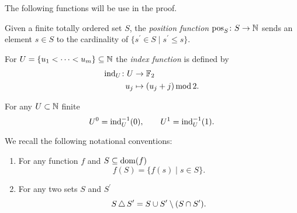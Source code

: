 The following functions will be use in the proof.

\begin{definition} \label{d:position function}
	Given a finite totally ordered set $S$, the \textit{position function} $\operatorname{pos}_S \colon S \to \mathbb{N}$ sends an element $s \in S$ to the cardinality of $\{s^\prime \in S \mid s^\prime \leq s\}$.
\end{definition}

\begin{definition} \label{d:index function}
	For $U = \{u_1 < \cdots < u_m\} \subseteq \mathbb{N}$ the \textit{index function} is defined by
	\[
	\begin{split}
	\mathrm{ind}_U \colon U & \to {\mathbb{F}_2} \\
	u_j & \mapsto (u_j + j) \operatorname{mod} 2.
	\end{split}
	\]
\end{definition}

\begin{lemma} \label{l:partition via index function}
	For any $U \subset \mathbb{N}$ finite
	\[
	U^0 = \mathrm{ind}_U^{-1}(0), \qquad
	U^1 = \mathrm{ind}_U^{-1}(1).
	\]
\end{lemma}

\begin{notation}
	We recall the following notational conventions:
	\begin{enumerate}
		\item For any function $f$ and $S \subseteq \operatorname{dom}(f)$
		\[
		f(S) = \{ f(s) \mid s \in S\}.
		\]
		\item For any two sets $S$ and $S^\prime$
		\[
		S \operatorname{\triangle} S^\prime = S \cup S^\prime \setminus (S \cap S^\prime).
		\]
	\end{enumerate}
\end{notation}

